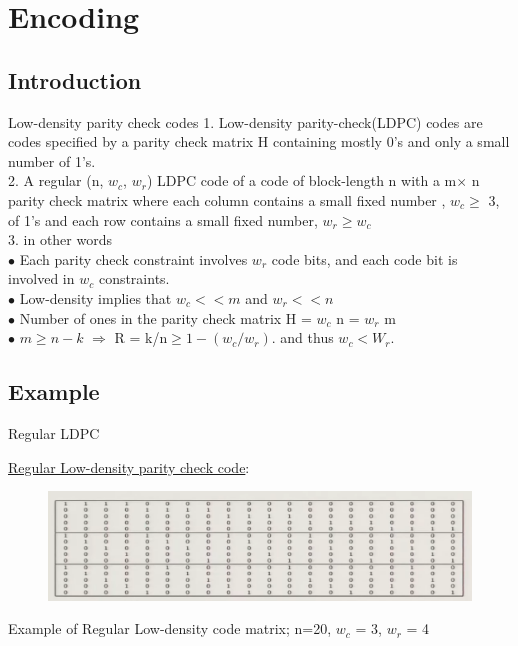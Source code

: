 \section{Encoding}
\subsection{Introduction}
\begin{frame}{Low-density parity check codes}
 1. Low-density parity-check(LDPC) codes are codes specified by a parity check matrix H containing mostly 0's and only a small number of 1's.\\
 2. A regular (n, $w_c$, $w_r$) LDPC code of a code of block-length n with a m$\times$ n parity check matrix where each column contains a small fixed number , $w_c \geq$ 3, of 1's and each row contains a small fixed number,  $w_r \geq w_c$\\
3. in other words\\
$\bullet$ Each parity check constraint involves $w_r$ code bits, and each code bit is involved in $w_c$ constraints.\\
$\bullet$ Low-density implies that $w_c <<  m $ and $ w_r <<  n $\\
$\bullet$ Number of ones in the parity check matrix  H = $w_c$ n = $w_r$ m \\
$\bullet$ $m\geq n-k $ \;\;$\Rightarrow$\;\; R = k/n\;$\geq 1 -(w_c / w_r)$. and thus $w_c < W_r$.
\end{frame}
\subsection{Example}

\begin{frame}{Regular LDPC}

\begin{exampleblock}{\underline{Regular Low-density parity check code}:}

\begin{figure}
			\includegraphics[width=\textwidth]{encoding/R LDPC.png}
		\end{figure}
\end{exampleblock}
Example of Regular Low-density  code matrix; n=20, $w_c$ = 3,  $w_r$ = 4   
\end{frame}

